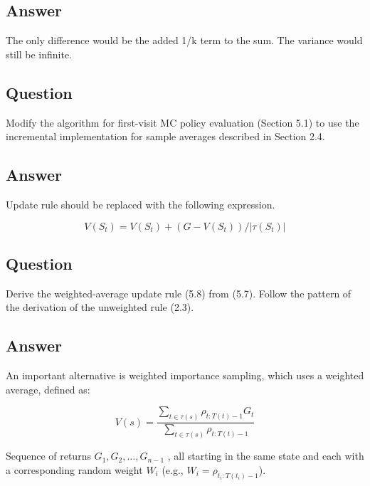 \documentclass[11pt]{article}
\begin{document}
    \subsection*{Answer}

    The only difference would be the added 1/k term to the sum.
    The variance would still be infinite.

    \subsection{Question}

    Modify the algorithm for first-visit MC policy evaluation (Section 5.1) to use the incremental implementation for sample averages described in Section 2.4.

    \subsection*{Answer}

    Update rule should be replaced with the following expression.

    \begin{equation}
        V(S_{t}) = V(S_{t}) + (G - V(S_{t})) / |\tau(S_{t})|
    \end{equation}

    \subsection{Question}
    \label{question:derive-update-rule-5-8}

    Derive the weighted-average update rule (5.8) from (5.7).
    Follow the pattern of the derivation of the unweighted rule (2.3).

    \subsection*{Answer}

    An important alternative is weighted importance sampling, which uses a weighted average, defined as:

    \begin{equation}
        V(s) = \frac{ \sum_{t \in \tau(s)} \rho_{t:T(t)-1} G_t }{\sum_{t \in \tau(s)} \rho_{t:T(t)-1}}
    \end{equation}

    Sequence of returns $G_1 , G_2 , \dots , G_{n-1}$ , all starting in the same state and each with a corresponding random weight $W_i$ (e.g., $ W_i = \rho_{ t_i : T (t_i)-1} $).
\end{document}

